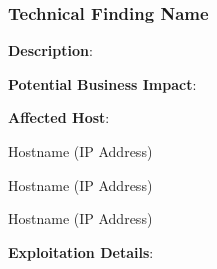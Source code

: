 
\subsubsection{Technical Finding Name}

\label{sec:finding_template}
\noindent


\noindent


\color{black}{}
\textbf{Description}:
    

\noindent
\textbf{Potential Business Impact}:
    


\noindent
\textbf{Affected Host}:

    Hostname (IP Address)
    
    Hostname (IP Address)
    
    Hostname (IP Address)

\noindent
\textbf{Exploitation Details}:
    

\begin{lstlisting}[language=bash,frame=single,showstringspaces=false]

\end{lstlisting}


